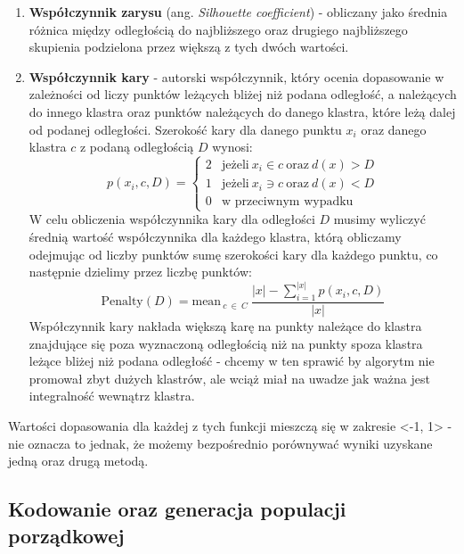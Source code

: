 \documentclass{classrep}
\begin{document}
\begin{enumerate}
    \item \textbf{Współczynnik zarysu} (ang. \textit{Silhouette coefficient}) - obliczany jako średnia różnica między odległością do najbliższego oraz drugiego najbliższego skupienia podzielona przez większą z tych dwóch wartości. \cite{Silhouette}
    \item \textbf{Współczynnik kary} -  autorski współczynnik, który ocenia dopasowanie w zależności od liczy punktów leżących bliżej niż podana odległość, a należących do innego klastra oraz punktów należących do danego klastra, które leżą dalej od podanej odległości. Szerokość kary dla danego punktu $x_{i}$ oraz danego klastra $c$ z podaną odległością $D$ wynosi: 
    \begin{equation}
        p(x_{i}, c, D) =
        \begin{cases}
            2 & \text{jeżeli}\ x_{i} \in c \ \text{oraz}\ d(x) > D \\
            1 & \text{jeżeli}\ x_{i} \ni c \ \text{oraz}\ d(x) < D \\
            0 & \text{w przeciwnym wypadku}
        \end{cases}
    \end{equation}
    W celu obliczenia współczynnika kary dla odległości $D$ musimy wyliczyć średnią wartość współczynnika dla każdego klastra, którą obliczamy odejmując od liczby punktów sumę szerokości kary dla każdego punktu, co następnie dzielimy przez liczbę punktów: 
    \begin{equation}
         \text{Penalty}(D) = \text{mean}_{\ c \ \in \ C} \ \dfrac{|x| - \sum_{i=1}^{|x|} p(x_{i}, c, D)}{|x|}
    \end{equation}
    Współczynnik kary nakłada większą karę na punkty należące do klastra znajdujące się poza wyznaczoną odległością niż na punkty spoza klastra leżące bliżej niż podana odległość - chcemy w ten sprawić by algorytm nie promował zbyt dużych klastrów, ale wciąż miał na uwadze jak ważna jest integralność wewnątrz klastra.
\end{enumerate}

Wartości dopasowania dla każdej z tych funkcji mieszczą się w zakresie <-1, 1> - nie oznacza to jednak, że możemy bezpośrednio porównywać wyniki uzyskane jedną oraz drugą metodą.

\subsection{Kodowanie oraz generacja populacji porządkowej}
\end{document}
